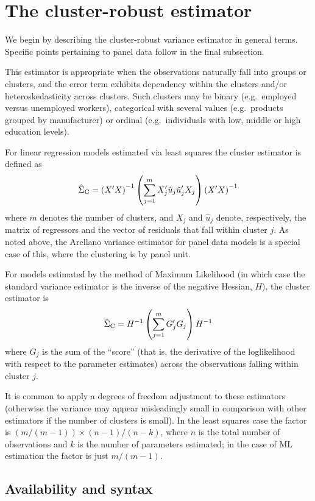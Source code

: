 \section{The cluster-robust estimator}
\label{sec:vcv-cluster}

We begin by describing the cluster-robust variance estimator in
general terms. Specific points pertaining to panel data follow in the
final subsection.

This estimator is appropriate when the observations naturally fall
into groups or clusters, and the error term exhibits dependency within
the clusters and/or heteroskedasticity across clusters. Such clusters
may be binary (e.g.\ employed versus unemployed workers), categorical
with several values (e.g.\ products grouped by manufacturer) or
ordinal (e.g.\ individuals with low, middle or high education levels).

For linear regression models estimated via least squares the cluster
estimator is defined as
\[
\hat{\Sigma}_{\rm C} = \left(X'X\right)^{-1} 
  \left(\sum_{j=1}^m X_j'\hat{u}_j \hat{u}_j' X_j\right)
  \left(X'X\right)^{-1}
\]
where $m$ denotes the number of clusters, and $X_j$ and $\hat{u}_j$
denote, respectively, the matrix of regressors and the vector of
residuals that fall within cluster $j$. As noted above, the Arellano
variance estimator for panel data models is a special case of this,
where the clustering is by panel unit.

For models estimated by the method of Maximum Likelihood (in which
case the standard variance estimator is the inverse of the negative
Hessian, $H$), the cluster estimator is
\[
\hat{\Sigma}_{\rm C} = H^{-1} \left(\sum_{j=1}^m G_j' G_j\right)
  H^{-1}
\]
where $G_j$ is the sum of the ``score'' (that is, the derivative of
the loglikelihood with respect to the parameter estimates) across the
observations falling within cluster $j$.

It is common to apply a degrees of freedom adjustment to these
estimators (otherwise the variance may appear misleadingly small in
comparison with other estimators if the number of clusters is small).
In the least squares case the factor is $(m/(m-1)) \times
(n-1)/(n-k)$, where $n$ is the total number of observations and $k$ is
the number of parameters estimated; in the case of ML estimation the
factor is just $m/(m-1)$.

\subsection{Availability and syntax}

